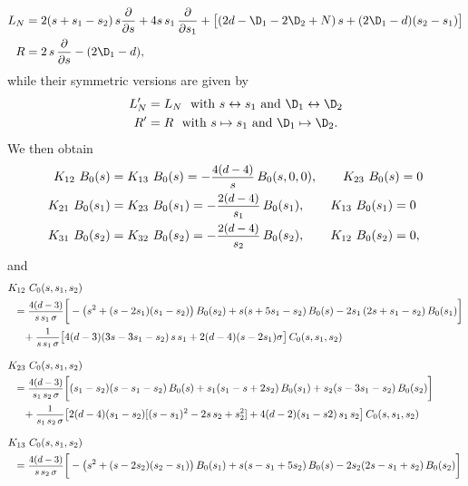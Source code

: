 \documentclass[a4paper,11pt,openright,twoside]{book}
\let\s=\sigma  \let\t=\tau     \let\u=\upsilon \let\f=\phi
\newcommand{\sdfrac}[2]{\mbox{\small$\displaystyle\frac{#1}{#2}$}}
\numberwithin{equation}{section}
\begin{document}
{{\begin{align}
	L_N&=2(s+s_1-s_2)\,s\frac{\partial}{\partial s}+4s\,s_1\,\frac{\partial }{\partial s_1}+ \big[(2d-\D_1-2\D_2+N)\,s+(2\D_1-d)(s_2-s_1)\big]\\
	R&=2\,s\,\frac{\partial}{\partial s}-(2\D_1-d),
\end{align}
while their symmetric versions are given by
\begin{align}
	L'_N&=L_N\ \ \text{with $s\leftrightarrow s_1$ and $\D_1\leftrightarrow\D_2$} \\
	R'&=R\ \ \text{with $s\mapsto s_1$ and $\D_1\mapsto\D_2$}.
\end{align}
We then obtain
\begin{subequations}
	\begin{align}
		K_{12}\ B_0(s)&=K_{13}\ B_0(s)=-\sdfrac{4( d-4)}{s}\,B_0(s,0,0),\qquad K_{23}\ B_0(s)=0\\
		K_{21}\ B_0(s_1)&=K_{23}\ B_0(s_1)=-\sdfrac{2( d-4)}{s_1}\,B_0(s_1),\qquad K_{13}\ B_0(s_1)=0\\
		K_{31}\ B_0(s_2)&=K_{32}\ B_0(s_2)=-\sdfrac{2( d-4)}{s_2}\,B_0(s_2),\qquad K_{12}\ B_0(s_2)=0,
	\end{align}
\end{subequations}
and 
\begin{subequations}
	\begin{align}
		&K_{12}\ C_0(s,s_1,s_2)\notag\\
		&\hspace{0.2cm}=\sdfrac{4( d-3)}{s\,s_1\,\s}\bigg[-\big(s^2+(s-2s_1)(s_1-s_2)\big)\,B_0(s_2)+s(s+5s_1-s_2)\,B_0(s)-2s_1\,(2s+s_1-s_2)\,B_0(s_1)\bigg]\notag\\
		&\hspace{0.5cm}+\sdfrac{1}{s\,s_1\,\s}\big[4( d-3)(3s-3s_1-s_2)\,s\,s_1+2( d-4)(s-2s_1)\s\big]\,C_0(s,s_1,s_2)
		\\[2ex]
		&K_{23}\ C_0(s,s_1,s_2)\notag\\
		&\hspace{0.2cm}=\sdfrac{4( d-3)}{s_1\,s_2\,\s}\bigg[(s_1-s_2)(s-s_1-s_2)\,B_0(s)+s_1(s_1-s+2s_2)\,B_0(s_1)+s_2(s-3s_1-s_2)\,B_0(s_2)\bigg]\notag\\
		&\hspace{0.5cm}+\sdfrac{1}{s_1\,s_2\,\s}\big[2( d-4)(s_1-s_2)[(s-s_1)^2-2s\,s_2+s_2^2]+4( d-2)(s_1-s2)\,s_1\,s_2\big]\,C_0(s,s_1,s_2)\\[2ex]
		&K_{13}\ C_0(s,s_1,s_2)\notag\\
		&\hspace{0.2cm}=\sdfrac{4( d-3)}{s\,s_2\,\s}\bigg[-\big(s^2+(s-2s_2)(s_2-s_1)\big)\,B_0(s_1)+s(s-s_1+5s_2)\,B_0(s)-2s_2(2s-s_1+s_2)\,B_0(s_2)\bigg]\notag\notag\\

\end{align}
\end{subequations}}}
\end{document}
